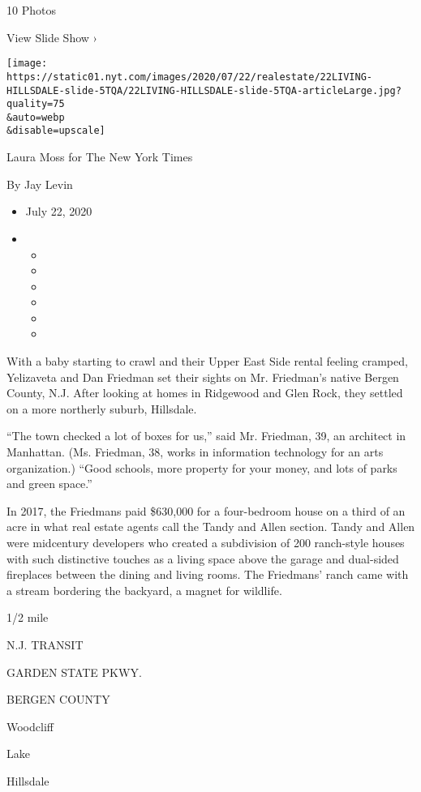 10 Photos

View Slide Show ›

\texttt{[image: https://static01.nyt.com/images/2020/07/22/realestate/22LIVING-HILLSDALE-slide-5TQA/22LIVING-HILLSDALE-slide-5TQA-articleLarge.jpg?quality=75\\\&auto=webp\\\&disable=upscale]}

Laura Moss for The New York Times

By Jay Levin

\begin{itemize}
\item
  July 22, 2020
\item
  \begin{itemize}
  \item
  \item
  \item
  \item
  \item
  \item
  \end{itemize}
\end{itemize}

With a baby starting to crawl and their Upper East Side rental feeling
cramped, Yelizaveta and Dan Friedman set their sights on Mr. Friedman's
native Bergen County, N.J. After looking at homes in Ridgewood and Glen
Rock, they settled on a more northerly suburb, Hillsdale.

``The town checked a lot of boxes for us,'' said Mr. Friedman, 39, an
architect in Manhattan. (Ms. Friedman, 38, works in information
technology for an arts organization.) ``Good schools, more property for
your money, and lots of parks and green space.''

In 2017, the Friedmans paid \$630,000 for a four-bedroom house on a
third of an acre in what real estate agents call the Tandy and Allen
section. Tandy and Allen were midcentury developers who created a
subdivision of 200 ranch-style houses with such distinctive touches as a
living space above the garage and dual-sided fireplaces between the
dining and living rooms. The Friedmans' ranch came with a stream
bordering the backyard, a magnet for wildlife.

1/2 mile

N.J. TRANSIT

GARDEN STATE PKWY.

BERGEN COUNTY

Woodcliff

Lake

Hillsdale

